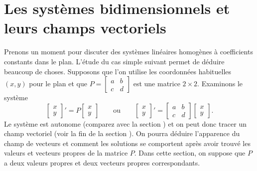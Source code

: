 
\sectionnewpage
\section{Les systèmes bidimensionnels et leurs champs vectoriels}
\label{sec:twodimaut}


Prenons un moment pour discuter des systèmes linéaires homogènes à coefficients constants dans le plan. L’étude du cas simple suivant permet de déduire beaucoup de choses. Supposons que l’on utilise les coordonnées habituelles $(x,y)$ pour le plan et que
$P = \left[ \begin{smallmatrix} a & b \\ c & d \end{smallmatrix} \right]$ 
est une matrice $2 \times 2$.  Examinons le système
\begin{equation} \label{pln:eq}
\begin{bmatrix} x \\ y \end{bmatrix} ' =
P \begin{bmatrix} x \\ y \end{bmatrix} 
\qquad 
\text{ou}
\qquad
\begin{bmatrix} x \\ y \end{bmatrix} ' =
\begin{bmatrix} a & b \\ c & d \end{bmatrix} 
\begin{bmatrix} x \\ y \end{bmatrix} 
.
\end{equation}
Le système est autonome (comparez avec la section )
et on peut donc tracer un champ vectoriel (voir la fin de la section
).
On pourra déduire l’apparence du champ de vecteurs et comment les solutions se comportent après avoir trouvé les valeurs et vecteurs propres de la matrice $P$.
Dans cette section, on suppose que $P$ a deux valeurs propres et deux vecteurs propres correspondants.

\medskip

